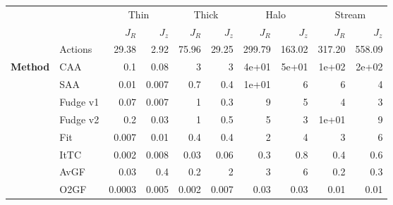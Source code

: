 \begin{tabular}{llrrrrrrrr}
&&\multicolumn{2}{c}{Thin}&\multicolumn{2}{c}{Thick}&\multicolumn{2}{c}{Halo}&\multicolumn{2}{c}{Stream}\\
&&$J_R$&$J_z$&$J_R$&$J_z$&$J_R$&$J_z$&$J_R$&$J_z$\\
\hline
 &Actions & 29.38 & 2.92 & 75.96 & 29.25 & 299.79 &  163.02 & 317.20 &   558.09 \\
\hline
\hline
 \textbf{Method}&CAA      & 0.1   & 0.08  & 3   & 3   & 4e+01 & 5e+01 & 1e+02 & 2e+02 \\
 &SAA      & 0.01  & 0.007 & 0.7 & 0.4 & 1e+01 & 6     & 6     & 4     \\
 &Fudge v1 & 0.07  & 0.007 & 1   & 0.3 & 9     & 5     & 4     & 3     \\
 &Fudge v2 & 0.2   & 0.03  & 1   & 0.5 & 5     & 3     & 1e+01 & 9     \\
 &Fit      & 0.007 & 0.01  & 0.4 & 0.4 & 2     & 4     & 3     & 6     \\
\hline
 &ItTC   & 0.002  & 0.008 & 0.03  & 0.06  & 0.3  & 0.8  & 0.4  & 0.6  \\
 &AvGF & 0.03   & 0.4   & 0.2   & 2     & 3    & 6    & 0.2  & 0.3  \\
 &O2GF   & 0.0003 & 0.005 & 0.002 & 0.007 & 0.03 & 0.03 & 0.01 & 0.01 \\
\hline
\end{tabular}
